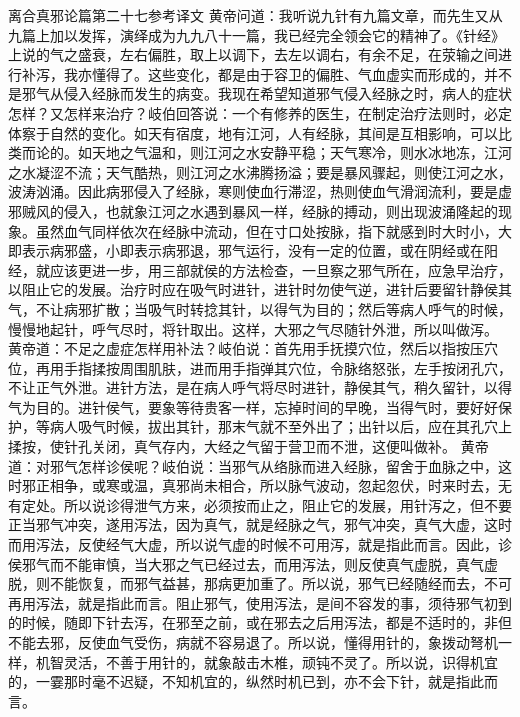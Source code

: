 \documentclass[a4paper,12pt,UTF8,twoside]{ctexbook}
\begin{document}
离合真邪论篇第二十七参考译文
黄帝问道：我听说九针有九篇文章，而先生又从九篇上加以发挥，演绎成为九九八十一篇，我已经完全领会它的精神了。《针经》上说的气之盛衰，左右偏胜，取上以调下，去左以调右，有余不足，在荥输之间进行补泻，我亦懂得了。这些变化，都是由于容卫的偏胜、气血虚实而形成的，并不是邪气从侵入经脉而发生的病变。我现在希望知道邪气侵入经脉之时，病人的症状怎样？又怎样来治疗？岐伯回答说：一个有修养的医生，在制定治疗法则时，必定体察于自然的变化。如天有宿度，地有江河，人有经脉，其间是互相影响，可以比类而论的。如天地之气温和，则江河之水安静平稳；天气寒冷，则水冰地冻，江河之水凝涩不流；天气酷热，则江河之水沸腾扬溢；要是暴风骤起，则使江河之水，波涛汹涌。因此病邪侵入了经脉，寒则使血行滞涩，热则使血气滑润流利，要是虚邪贼风的侵入，也就象江河之水遇到暴风一样，经脉的搏动，则出现波涌隆起的现象。虽然血气同样依次在经脉中流动，但在寸口处按脉，指下就感到时大时小，大即表示病邪盛，小即表示病邪退，邪气运行，没有一定的位置，或在阴经或在阳经，就应该更进一步，用三部就侯的方法检查，一旦察之邪气所在，应急早治疗，以阻止它的发展。治疗时应在吸气时进针，进针时勿使气逆，进针后要留针静侯其气，不让病邪扩散；当吸气时转捻其针，以得气为目的；然后等病人呼气的时候，慢慢地起针，呼气尽时，将针取出。这样，大邪之气尽随针外泄，所以叫做泻。
黄帝道：不足之虚症怎样用补法？岐伯说：首先用手抚摸穴位，然后以指按压穴位，再用手指揉按周围肌肤，进而用手指弹其穴位，令脉络怒张，左手按闭孔穴，不让正气外泄。进针方法，是在病人呼气将尽时进针，静侯其气，稍久留针，以得气为目的。进针侯气，要象等待贵客一样，忘掉时间的早晚，当得气时，要好好保护，等病人吸气时候，拔出其针，那末气就不至外出了；出针以后，应在其孔穴上揉按，使针孔关闭，真气存内，大经之气留于营卫而不泄，这便叫做补。
黄帝道：对邪气怎样诊侯呢？岐伯说：当邪气从络脉而进入经脉，留舍于血脉之中，这时邪正相争，或寒或温，真邪尚未相合，所以脉气波动，忽起忽伏，时来时去，无有定处。所以说诊得泄气方来，必须按而止之，阻止它的发展，用针泻之，但不要正当邪气冲突，遂用泻法，因为真气，就是经脉之气，邪气冲突，真气大虚，这时而用泻法，反使经气大虚，所以说气虚的时候不可用泻，就是指此而言。因此，诊侯邪气而不能审慎，当大邪之气已经过去，而用泻法，则反使真气虚脱，真气虚脱，则不能恢复，而邪气益甚，那病更加重了。所以说，邪气已经随经而去，不可再用泻法，就是指此而言。阻止邪气，使用泻法，是间不容发的事，须待邪气初到的时候，随即下针去泻，在邪至之前，或在邪去之后用泻法，都是不适时的，非但不能去邪，反使血气受伤，病就不容易退了。所以说，懂得用针的，象拨动弩机一样，机智灵活，不善于用针的，就象敲击木椎，顽钝不灵了。所以说，识得机宜的，一霎那时毫不迟疑，不知机宜的，纵然时机已到，亦不会下针，就是指此而言。
\end{document}
